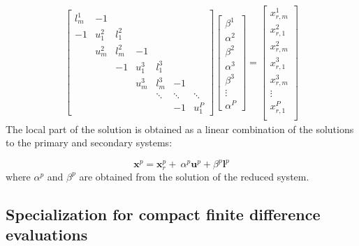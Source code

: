 \begin{align} \label{eqn:reduced-system}
&
\begin{bmatrix}
l^1_m & -1 \\
-1    & u^2_1 & l^2_1 \\
      & u^2_m & l^2_m & -1 \\
      &       & -1    & u^3_1 & l^3_1 \\
      &       &       & u^3_m & l^3_m  & -1 \\
      &       &       &       & \ddots & \ddots & \ddots \\
      &       &       &       &        & -1     & u^P_1
\end{bmatrix}
\begin{bmatrix}
\beta^1 \\
\alpha^2 \\
\beta^2 \\
\alpha^3 \\
\beta^3 \\
\vdots \\
\alpha^P
\end{bmatrix}
=
\begin{bmatrix}
x_{r,m}^1 \\
x_{r,1}^2 \\
x_{r,m}^2 \\
x_{r,1}^3 \\
x_{r,m}^3 \\
\vdots \\
x_{r,1}^P \\
\end{bmatrix}
&
\end{align}
The local part of the solution
is obtained as a linear combination of
the solutions to the primary and secondary systems:

\begin{equation}
    \bm{x}^p = \bm{x}_r^p + \
        \alpha^p \bm{u}^p + \beta^p \bm{l}^p
    \label{eqn:sum-of-systems}
\end{equation}
%
where $\alpha^p$ and $\beta^p$ are obtained
from the solution of the reduced system.

\subsection{Specialization for compact finite difference
    evaluations}

